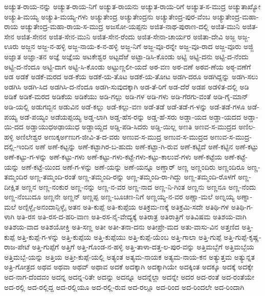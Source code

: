 ಅಚ್ಯುತ-ರಾಯ-ನನ್ನು
ಅಚ್ಯುತ-ರಾಯ-ನಿಗೆ
ಅಚ್ಯುತ-ರಾಯನು
ಅಚ್ಯುತ-ರಾಯ-ರಿಗೆ
ಅಚ್ಯುತ-ಸ-ಮುದ್ರ
ಅಚ್ಯುತಾಖ್ಯೋ
ಅಚ್ಯುತಿ-ಮಯ್ಯ
ಅಚ್ಯುತಿ-ಮಯ್ಯ-ಗಳು
ಅಚ್ಯುತೇಂದ್ರ
ಅಚ್ಯುತೇಂದ್ರನು
ಅಚ್ಯುತೇಂದ್ರ-ಪುರ-ವೆಂಬ
ಅಚ್ಯುತೇಂದ್ರ-ಮಹಾ-ರಾಯ
ಅಚ್ಯುತೇಂದ್ರ-ಮಹಾ-ರಾಯ-ಸ-ಮುದ್ರ
ಅಜಸೋ-ಯಪ್ಪನು
ಅಜಿತ-ನಾಥ-ಪುರಾಣ-ದಲ್ಲಿ
ಅಜಿತ-ಮುನಿ
ಅಜಿತ-ಸೇನ
ಅಜಿತ-ಸೇನನ
ಅಜಿತ-ಸೇನ-ಮುನಿ
ಅಜಿತ-ಸೇನ-ರೆಂದು
ಅಜಿತ-ಸೇನಾ-ಚಾರ್ಯರ
ಅಜಿತಾ-ದೇವಿ
ಅಜ್ಜ
ಅಜ್ಜ-ಊರು
ಅಜ್ಜನ
ಅಜ್ಜ-ನ-ಹಳ್ಳಿ
ಅಜ್ಜ-ನಾಯ-ಕ-ನ-ಹಳ್ಳಿ
ಅಜ್ಜ-ನಿಗೆ
ಅಜ್ಜ-ವೂ-ರನ್ನೇ
ಅಜ್ಜ-ವೂ-ರಾದ
ಅಜ್ಜ-ವೂರು
ಅಜ್ಜಿ
ಅಜ್ಞಾತ
ಅಜ್ಞಾ-ತನ
ಅಜ್ಞೆ
ಅಜ್ಞೆಯ
ಅಟಕೇಶ್ವರ
ಅಟ್ಟದೆಱೆ
ಅಟ್ಟಾ-ಡಿಸಿ-ಕೊಂಡು
ಅಟ್ಟಿ
ಅಟ್ಟಿ-ದನು
ಅಟ್ಟಿ-ದ-ನೆಂದು
ಅಟ್ಟಿ-ದ-ನೆಂದೂ
ಅಟ್ಟಿ-ದಾಗ
ಅಟ್ಟಿ-ಸಿ-ಕೊಂಡು
ಅಟ್ಟುಣ್ಣಲೀ-ಯದೆ
ಅಠ-ವಣ
ಅಠ-ವಣೆ
ಅಠವ-ಣೆಯ
ಅಠ್ಠ-ವಣೆಗೆ
ಅಡ
ಅಡಕೆ
ಅಡಕೆ-ಮರದ
ಅಡ-ಕೆಯ
ಅಡಕೆ-ಯ-ತೊಟ
ಅಡಕೆ-ಯ-ತೋಟ
ಅಡಗಿ-ದರೂ
ಅಡಗಿದ್ದನ್ನು
ಅಡಗಿ-ಸಲು
ಅಡಗಿಸಿ
ಅಡಗಿ-ಸಿದ
ಅಡಗಿಸಿ-ದ-ನೆಂದೂ
ಅಡಗಿ-ಸುವುದಕ್ಕಾಗಿ
ಅಡ-ತೆ-ರಿಗೆ
ಅಡ-ದೆರೆ
ಅಡಪ
ಅಡಳಿತ-ದಲ್ಲಿ
ಅಡಿ
ಅಡಿಕೆ
ಅಡಿಕೆ-ಮರದ
ಅಡಿಕೆಯ
ಅಡಿಕೆಯು
ಅಡಿ-ಗಲ್ಲು
ಅಡಿ-ಗಳ
ಅಡಿ-ಗಳು
ಅಡಿ-ಗೆರಗು-ವಂತೆ
ಅಡಿ-ಗೈ-ಮಾನ್
ಅಡಿ-ಯಲ್ಲಿ
ಅಡುಗಬ್ಬಿನ
ಅಡುವಿನ
ಅಡೆ-ಕಲ್ಲು
ಅಡೆ-ಕಲ್ಲು-ವಣ
ಅಡೆ-ತಡೆ
ಅಡೆ-ತಡೆ-ಗ-ಳನ್ನು
ಅಡೆ-ತಡೆ-ಗಳೂ
ಅಡೆ-ಪಯ್ಯ
ಅಡೆ-ಪಯ್ಯಂ
ಅಡೆಯಪ್ಪಯ್ಯ
ಅಡ್ಡ-ಲಾಗಿ
ಅಡ್ಡ-ಹೆಸ-ರನ್ನು
ಅಡ್ಡ-ಹೆ-ಸರು
ಅಡ್ಡಾ-ಯದ
ಅಡ್ಡಾ-ಯದದ
ಅಡ್ಡಾ-ಯಿ-ದದ
ಅಡ್ಡಾಯುಧಅಢಾಯುಧ
ಅಡ್ಡಾಯ್ದದ
ಅಡ್ಡಿ-ಪಡಿ-ಸಿದರು
ಅಡ್ಡಿ-ಯಿಲ್ಲ
ಅಣತಿ
ಅಣವ-ಸ-ಮುದ್ರದ
ಅಣಿಲ-ಹಳ್ಳಿ
ಅಣಿಲೇಶ್ವರ
ಅಣುಕ್ಕರ್ಅಣುಗ-ಜೀವಿ-ತ-ದ-ವರು
ಅಣುವ-ಸ-ಮುದ್ರ
ಅಣುವ-ಸ-ಮುದ್ರದ
ಅಣುವ-ಸ-ಮುದ್ರ-ದಲ್ಲಿ-ಇಂದಿನ
ಅಣೆ
ಅಣೆ-ಕಟ್ಟನ್ನು
ಅಣೆ-ಕಟ್ಟಾಗಿರ-ಬ-ಹುದು
ಅಣೆ-ಕಟ್ಟಾ-ಗಿ-ರುವ
ಅಣೆ-ಕಟ್ಟಿದೆ
ಅಣೆ-ಕಟ್ಟಿನ
ಅಣೆ-ಕಟ್ಟು
ಅಣೆ-ಕಟ್ಟು-ಗ-ಳನ್ನು
ಅಣೆ-ಕಟ್ಟು-ಗಳು
ಅಣೆ-ಕಟ್ಟು-ಗಳು-ಕಟ್ಟೆ-ಗಳು-ಕಟ್ಟು-ಕಾಲುವೆ-ಗಳು
ಅಣೆ-ಕಟ್ಟೆಯ
ಅಣೆ-ಕಟ್ಟೆ-ಯನ್ನು
ಅಣೆ-ಕಟ್ಟೆ-ಯಿಂದ
ಅಣೆ-ಗ-ಳನ್ನು
ಅಣೆ-ಯನ್ನು
ಅಣೆ-ಯನ್ನೂ
ಅಣ್ಡಾರ್
ಅಣ್ಣ
ಅಣ್ಣಂದಿರು
ಅಣ್ಣಂದಿರೂ
ಅಣ್ಣ-ತಮ್ಮಂದಿರ
ಅಣ್ಣ-ತಮ್ಮಂದಿ-ರಂತೆ
ಅಣ್ಣ-ತಮ್ಮಂದಿ-ರನ್ನು
ಅಣ್ಣ-ತಮ್ಮಂದಿ-ರಾ-ಗಿದ್ದು
ಅಣ್ಣ-ತಮ್ಮಂದಿ-ರೊಳಗೆ
ಅಣ್ಣ-ದೀಕ್ಷಿತ
ಅಣ್ಣನ
ಅಣ್ಣ-ನಂಕುರ
ಅಣ್ಣ-ನನ್ನು
ಅಣ್ಣ-ನ-ವರ
ಅಣ್ಣ-ನಾದ
ಅಣ್ಣ-ನಿ-ಗಿಂತ
ಅಣ್ಣನು
ಅಣ್ಣನೂ
ಅಣ್ಣ-ನೆಂದು
ಅಣ್ಣ-ನೆಂಬುದೂ
ಅಣ್ಣನೇ
ಅಣ್ಣನ್
ಅಣ್ಣಪ್ಪ
ಅಣ್ಣ-ಬೂಚಣ-ನಿಗೆ
ಅಣ್ಣಯ್ಯ-ನ-ವರ
ಅಣ್ಣಾ-ಮಲೆ
ಅಣ್ನಯ್ಯ
ಅಣ್ನಾ-ಮಲೆ
ಅಣ್ಪಿಳ್ಳೈ-ಅನಂದಾನ್ಪಿಳ್ಳೈ
ಅತನ
ಅತಿ-ಕುಪ್ಪೆ
ಅತಿ-ಕುಪ್ಪೆಯ
ಅತಿಕ್ರಮ-ಣಕ್ಕೆ
ಅತಿಕ್ರಮಿ-ಸದೇ
ಅತಿಥಿ-ಗಳ
ಅತಿಥಿ-ಗ-ಳಾಗಿ
ಅತಿ-ರಸ
ಅತಿ-ರಸ-ದ-ಹರಿ-ವಾಣ
ಅತಿ-ರಸ-ನೈ-ವೇದ್ಯಕ್ಕೆ
ಅತಿರಾತ್ರ
ಅತಿರಾತ್ರಿಗೆ
ಅತಿವಿಷಮ
ಅತಿಶಯ-ವಾಗಿ
ಅತಿಶಯ-ವಾದ
ಅತಿಶಯೋಕ್ತಿ
ಅತಿ-ಸಣ್ಣ
ಅತೀ
ಅತೀ-ತನಾ-ದನು
ಅತೀಪ್ರೇ-ಮದ
ಅತು-ವಾಸು-ವಿನ
ಅತ್ತಣಿದ
ಅತ್ತಿ-ಕುಪ್ಪೆ
ಅತ್ತಿ-ಕುಪ್ಪೆ-ಗ-ಳನ್ನು
ಅತ್ತಿ-ಕುಪ್ಪೆಯ
ಅತ್ತಿ-ಕುಪ್ಪೆಯು
ಅತ್ತಿ-ಕುಪ್ಪೆ-ಯೆಂಬ
ಅತ್ತಿ-ಗಾಲಾ
ಅತ್ತಿ-ಗುಪ್ಪೆ
ಅತ್ತಿ-ಗುಪ್ಪೆ-ಕೃಷ್ಣ-ರಾಜ-ಪೇಟೆ
ಅತ್ತಿ-ಗುಪ್ಪೆಗೆ
ಅತ್ತಿಗೆ
ಅತ್ತಿ-ಗೊಂಡ-ನ-ಹಳ್ಳಿ
ಅತ್ತಿ-ತಾಳಾ-ದತ್ತ-ಲ-ಪುರ-ವನ್ನು
ಅತ್ತಿಮಬ್ಬೆಗೆ
ಅತ್ತಿಮಬ್ಬೆಯ
ಅತ್ತಿಮಬ್ಬೆ-ಯನ್ನು
ಅತ್ತಿಯ
ಅತ್ತೀ-ಕುಪ್ಪೆ-ಯಲ್ಲಿ
ಅತ್ಯಂತ
ಅತ್ಯಮ-ನಾಯಕ
ಅತ್ಯಮ-ನಾಯ-ಕನ
ಅತ್ಯುತ್ತಮ
ಅತ್ಯುನ್ನತ
ಅತ್ರಿ-ಗೋತ್ರದ
ಅಥವ
ಅಥವಾ
ಅಥವ್
ಅಥಾವ
ಅದಕೆ
ಅದಕ್ಕಾಗಿ
ಅದಕ್ಕಾಗಿಯೇ
ಅದಕ್ಕಿಂತ
ಅದಕ್ಕೂ
ಅದಕ್ಕೆ
ಅದಕ್ಕೇ
ಅದ-ನಾಗ-ದೆಂದವಂ
ಅದನ್ನ
ಅದನ್ನ-ರಿತೇ
ಅದನ್ನು
ಅದನ್ನೂ
ಅದನ್ನೆಲ್ಲಾ
ಅದನ್ನೇ
ಅದರ
ಅದ-ರಂತೆ
ಅದ-ರಂತೆಯೇ
ಅದ-ರಲ್ಲಿ
ಅದ-ರಲ್ಲಿದ್ದ
ಅದ-ರಲ್ಲಿಯೂ
ಅದ-ರಲ್ಲಿ-ರುವ
ಅದ-ರಲ್ಲೂ
ಅದ-ರಿಂದ
ಅದ-ರಿಂದಲೇ
ಅದ-ರಿಂದಾಗಿ
